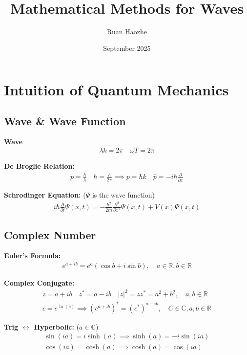 \documentclass[12pt]{article}
\title{Mathematical Methods for Waves }
\author{Ruan Haozhe }
\date{September 2025}
\begin{document}
 

\clearpage 

\section{Intuition of Quantum Mechanics } 

\subsection{Wave \& Wave Function } 

\textbf{Wave } 
\begin{align}
    \lambda k = 2\pi \quad \omega T = 2\pi 
\end{align} 

\textbf{De Broglie Relation: }
\begin{align}
    p = \frac{h}{\lambda} \quad \hbar = \frac{h}{2\pi} \implies p = \hbar k \quad \hat{p} = -i\hbar \frac{\partial}{\partial x}
\end{align}

\textbf{Schrodinger Equation: } ($\Psi$ is the wave function)
\begin{align}
    i\hbar \frac{\partial}{\partial t} \Psi(x,t) = -\frac{\hbar^2}{2m} \frac{\partial^2}{\partial x^2} \Psi(x,t) + V(x) \Psi(x,t)
\end{align} 

\subsection{Complex Number } 

\textbf{Euler's Formula: } 
\begin{align}
    e^{a + ib} = e^a(\cos b + i \sin b), \quad a \in \mathbb{R}, b \in \mathbb{R} 
\end{align}

\textbf{Complex Conjugate: }
\begin{align}
    z = a + ib \quad z^* = a - ib \quad |z|^2 = z z^* = a^2 + b^2, \quad a,b \in \mathbb{R} \\
    c = e^{\ln(c)} \implies (c^{a+ib})^* = (c^*)^{a-ib}, \quad C \in \mathbb{C}, a,b \in \mathbb{R}
\end{align}

\textbf{Trig $\leftrightarrow$ Hyperbolic: } ($a \in \mathbb{C}$)
\begin{align}
    \sin(ia) = i\sinh(a) \implies \sinh(a) = -i\sin(ia) \\
    \cos(ia) = \cosh(a) \implies \cosh(a) = \cos(ia)
\end{align}
\end{document}
